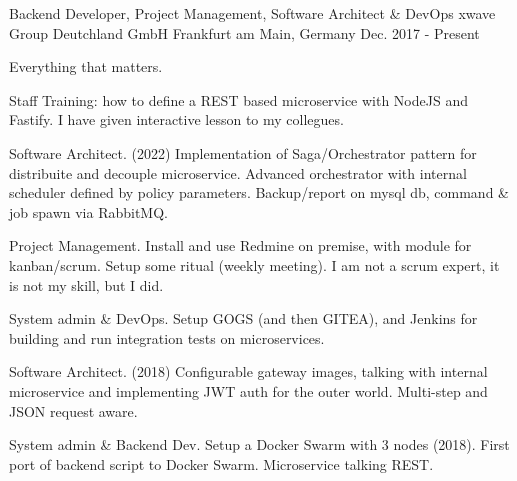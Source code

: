

\begin{cventries}

  \cventry
    {Backend Developer, Project Management, Software Architect \& DevOps} %
    {xwave Group Deutchland GmbH} %
    {Frankfurt am Main, Germany} %
    {Dec. 2017 - Present} %
    {
      \begin{cvitems} %
        \item {Everything that matters.}
        \item {Staff Training: how to define a REST based microservice with NodeJS and Fastify. I have given interactive lesson to my collegues.}
        \item {Software Architect. (2022) Implementation of Saga/Orchestrator pattern for distribuite and decouple microservice. Advanced orchestrator with internal scheduler defined by policy parameters. Backup/report on mysql db, command \& job spawn via RabbitMQ.}
        \item {Project Management. Install and use Redmine on premise, with module for kanban/scrum. Setup some ritual (weekly meeting). I am not a scrum expert, it is not my skill, but I did.}
        \item {System admin \& DevOps. Setup GOGS (and then GITEA), and Jenkins for building and run integration tests on microservices.}
        \item {Software Architect. (2018) Configurable gateway images, talking with internal microservice and implementing JWT auth for the outer world. Multi-step and JSON request aware.}
        \item {System admin \& Backend Dev. Setup a Docker Swarm with 3 nodes (2018). First port of backend script to Docker Swarm. Microservice talking REST.}
      \end{cvitems}
    }


\end{cventries}
